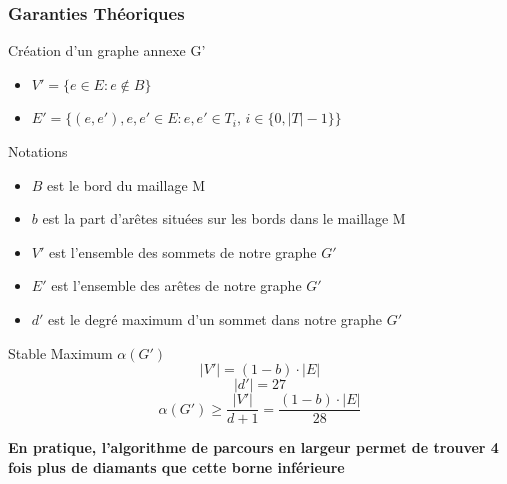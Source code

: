 \documentclass[9pt]{beamer}
\begin{document}
\begin{frame}[noframenumbering]
\small
\frametitle{Garanties Théoriques}
\begin{block}{Création d'un graphe annexe G'}
\begin{itemize}
\item $V' = \{e\in E : e\notin B\}$
\item $E'=\{(e,e'), e,e'\in E : e,e' \in T_i, \,  i\in \{0,|T|-1\}\}$ 
\end{itemize}
\end{block}
\begin{block}{Notations}
\begin{itemize}
\item $B$ est le bord du maillage M
\item $b$ est la part d'arêtes situées sur les bords dans le maillage M
\item $V'$ est l'ensemble des sommets de notre graphe $G'$
\item $E'$ est l'ensemble des arêtes de notre graphe $G'$
\item $d'$ est le degré maximum d'un sommet dans notre graphe $G'$
\end{itemize}
\end{block}

\begin{block}{Stable Maximum $\alpha(G')$}
\begin{equation}
|V'|=(1-b)\cdot |E|
\end{equation}
\begin{equation}
|d'|= 27
\end{equation}
\begin{equation}
\alpha(G')\geqslant \frac{|V'|}{d+1} = \frac{(1-b)\cdot |E|}{28}
\end{equation}
\end{block}
\textbf{En pratique, l'algorithme de parcours en largeur permet de trouver 4 fois plus de diamants que cette borne inférieure}
\end{frame}
\end{document}
